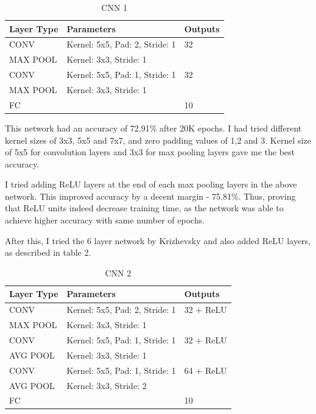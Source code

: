 \documentclass[10pt,twocolumn,letterpaper]{article}
\begin{document}
\begin{table}[h]

\begin{tabular}{|l|l|l|}
\hline
Layer Type & Parameters                     & Outputs \\ \hline
CONV       & Kernel: 5x5, Pad: 2, Stride: 1 & 32      \\ \hline
MAX POOL   & Kernel: 3x3, Stride: 1         &         \\ \hline
CONV       & Kernel: 5x5, Pad: 1, Stride: 1 & 32      \\ \hline
MAX POOL   & Kernel: 3x3, Stride: 1         &         \\ \hline
FC         &                                & 10      \\ \hline
\end{tabular}
\label{net1}
\caption{CNN 1}
\end{table}

This network had an accuracy of 72.91\% after 20K epochs. I had tried different kernel sizes of 3x3, 5x5 and 7x7, and zero padding values of 1,2 and 3. Kernel size of 5x5 for convolution layers and 3x3 for max pooling layers gave me the best accuracy.

I tried adding ReLU layers at the end of each max pooling layers in the above network. This improved accuracy by a decent margin - 75.81\%. Thus, proving that ReLU units indeed decrease training time, as the network was able to achieve higher accuracy with same number of epochs.

After this, I tried the 6 layer network by Krizhevsky and also added ReLU layers, as described in table 2.

\begin{table}[h]
\begin{tabular}{|l|l|l|}
\hline
Layer Type & Parameters                     & Outputs \\ \hline
CONV       & Kernel: 5x5, Pad: 2, Stride: 1 & 32 + ReLU     \\ \hline
MAX POOL   & Kernel: 3x3, Stride: 1         &         \\ \hline
CONV       & Kernel: 5x5, Pad: 1, Stride: 1 & 32 + ReLU      \\ \hline
AVG POOL   & Kernel: 3x3, Stride: 1         &         \\ \hline
CONV       & Kernel: 5x5, Pad: 1, Stride: 1 & 64 + ReLU     \\ \hline
AVG POOL   & Kernel: 3x3, Stride: 2         &         \\ \hline
FC         &                                & 10      \\ \hline
\end{tabular}
\label{net2}
\caption{CNN 2}
\end{table}
\end{document}
